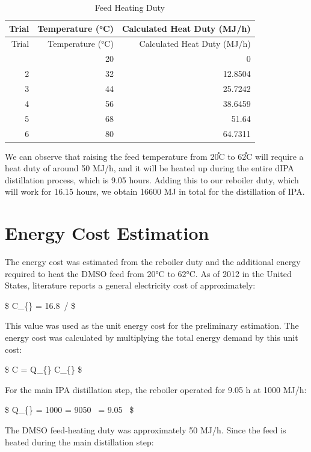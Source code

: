 \begin{longtable}[]{@{}rrr@{}}
\caption{Feed Heating Duty\\
\label{tab:Feed Heating Duty}}\tabularnewline
\toprule\noalign{}
Trial & Temperature (°C) & Calculated Heat Duty (MJ/h) \\
\midrule\noalign{}
\endfirsthead
\toprule\noalign{}
Trial & Temperature (°C) & Calculated Heat Duty (MJ/h) \\
\midrule\noalign{}
\endhead
\bottomrule\noalign{}
\endlastfoot
1 & 20 & 0 \\
2 & 32 & 12.8504 \\
3 & 44 & 25.7242 \\
4 & 56 & 38.6459 \\
5 & 68 & 51.64 \\
6 & 80 & 64.7311 \\
\end{longtable}

We can observe that raising the feed temperature from 20֯C to 62֯C will
require a heat duty of around 50 MJ/h, and it will be heated up during
the entire dIPA distillation process, which is 9.05 hours. Adding this
to our reboiler duty, which will work for 16.15 hours, we obtain 16600
MJ in total for the distillation of IPA.

\section{Energy Cost Estimation}\label{energy-cost-estimation}

The energy cost was estimated from the reboiler duty and the additional
energy required to heat the DMSO feed from 20°C to 62°C. As of 2012 in
the United States, literature reports a general electricity cost of
approximately:

\$ C\_\{\} = 16.8~\textdollar /  \$

This value was used as the unit energy cost for the preliminary
estimation. The energy cost was calculated by multiplying the total
energy demand by this unit cost:

\$ C = Q\_\{\} \cdot C\_\{\} \$

For the main IPA distillation step, the reboiler operated for 9.05 h at
1000 MJ/h:

\$ Q\_\{\} = 1000  = 9050~ =
9.05~ \$

The DMSO feed-heating duty was approximately 50 MJ/h. Since the feed is
heated during the main distillation step:

